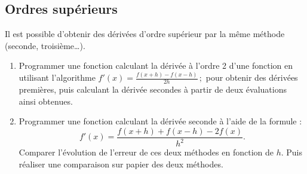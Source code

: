 \subsection{Ordres supérieurs \sc{[Facultatif]}}
Il est possible  d'obtenir des dérivées d'ordre supérieur  par la même
méthode (seconde, troisième\ldots).
\begin{enumerate}
\item Programmer une  fonction calculant la dérivée à  l'ordre 2 d'une
  fonction        en       utilisant        l'algorithme       $f'(x)=
  \frac{f(x+h)-f(x-h)}{2h}\,;$  pour  obtenir des  dérivées  premières,
  puis  calculant la  dérivée secondes  à partir  de deux  évaluations ainsi
  obtenues.
\item Programmer une fonction calculant la dérivée seconde à l'aide de
  la formule :
$$f'(x)=  \frac{f(x+h)+f(x-h)-2f(x)}{h^2}.$$  Comparer l'évolution  de
  l'erreur de ces deux méthodes en  fonction de $h$. Puis réaliser une
  comparaison \og{} sur papier \fg{} des deux méthodes.
\end{enumerate}







